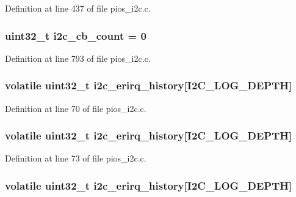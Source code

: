 \-Definition at line 437 of file pios\-\_\-i2c.\-c.

\hypertarget{group___p_i_o_s___i2_c_gadd232b764b6676824e5a173a7b78f9fd}{
\subsubsection[{i2c\-\_\-cb\-\_\-count}]{\setlength{\rightskip}{0pt plus 5cm}uint32\-\_\-t {\bf i2c\-\_\-cb\-\_\-count} = 0}}\label{group___p_i_o_s___i2_c_gadd232b764b6676824e5a173a7b78f9fd}


\-Definition at line 793 of file pios\-\_\-i2c.\-c.

\hypertarget{group___p_i_o_s___i2_c_ga682906503c30ce6f539ac8f7628346f8}{
\subsubsection[{i2c\-\_\-erirq\-\_\-history}]{\setlength{\rightskip}{0pt plus 5cm}volatile uint32\-\_\-t {\bf i2c\-\_\-erirq\-\_\-history}\mbox{[}\-I2\-C\-\_\-\-L\-O\-G\-\_\-\-D\-E\-P\-T\-H\mbox{]}}}\label{group___p_i_o_s___i2_c_ga682906503c30ce6f539ac8f7628346f8}


\-Definition at line 70 of file pios\-\_\-i2c.\-c.

\hypertarget{group___p_i_o_s___i2_c_ga682906503c30ce6f539ac8f7628346f8}{
\subsubsection[{i2c\-\_\-erirq\-\_\-history}]{\setlength{\rightskip}{0pt plus 5cm}volatile uint32\-\_\-t {\bf i2c\-\_\-erirq\-\_\-history}\mbox{[}\-I2\-C\-\_\-\-L\-O\-G\-\_\-\-D\-E\-P\-T\-H\mbox{]}}}\label{group___p_i_o_s___i2_c_ga682906503c30ce6f539ac8f7628346f8}


\-Definition at line 73 of file pios\-\_\-i2c.\-c.

\hypertarget{group___p_i_o_s___i2_c_ga682906503c30ce6f539ac8f7628346f8}{
\subsubsection[{i2c\-\_\-erirq\-\_\-history}]{\setlength{\rightskip}{0pt plus 5cm}volatile uint32\-\_\-t {\bf i2c\-\_\-erirq\-\_\-history}\mbox{[}\-I2\-C\-\_\-\-L\-O\-G\-\_\-\-D\-E\-P\-T\-H\mbox{]}}}\label{group___p_i_o_s___i2_c_ga682906503c30ce6f539ac8f7628346f8}


